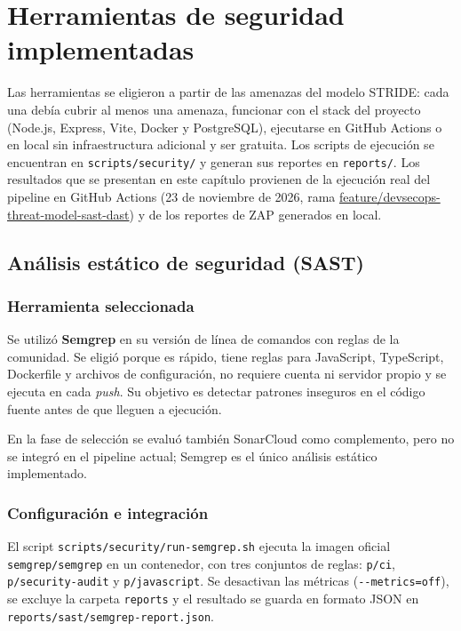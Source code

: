 
\chapter{Herramientas de seguridad implementadas}

Las herramientas se eligieron a partir de las amenazas del modelo STRIDE:
cada una debía cubrir al menos una amenaza, funcionar con el stack del
proyecto (Node.js, Express, Vite, Docker y PostgreSQL), ejecutarse en GitHub
Actions o en local sin infraestructura adicional y ser gratuita. Los scripts
de ejecución se encuentran en \texttt{scripts/security/} y generan sus
reportes en \texttt{reports/}. Los resultados que se presentan en este
capítulo provienen de la ejecución real del pipeline en GitHub Actions
(23 de noviembre de 2026, rama
\url{feature/devsecops-threat-model-sast-dast}) y de los reportes de ZAP
generados en local.


\section{Análisis estático de seguridad (SAST)}

\subsection{Herramienta seleccionada}

Se utilizó \textbf{Semgrep} en su versión de línea de comandos con reglas de
la comunidad. Se eligió porque es rápido, tiene reglas para JavaScript,
TypeScript, Dockerfile y archivos de configuración, no requiere cuenta ni
servidor propio y se ejecuta en cada \textit{push}. Su objetivo es detectar
patrones inseguros en el código fuente antes de que lleguen a ejecución.

En la fase de selección se evaluó también SonarCloud como complemento, pero
no se integró en el pipeline actual; Semgrep es el único análisis estático
implementado.

\subsection{Configuración e integración}

El script \texttt{scripts/security/run-semgrep.sh} ejecuta la imagen oficial
\texttt{semgrep/semgrep} en un contenedor, con tres conjuntos de reglas:
\texttt{p/ci}, \texttt{p/security-audit} y \texttt{p/javascript}. Se
desactivan las métricas (\texttt{-{}-metrics=off}), se excluye la carpeta
\texttt{reports} y el resultado se guarda en formato JSON en
\texttt{reports/sast/semgrep-report.json}.

